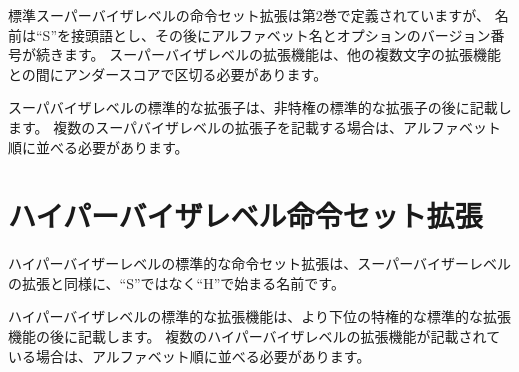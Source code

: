 \begin{comment}
Standard supervisor-level instruction-set extensions are defined in Volume II,
but are named using ``S'' as a prefix, followed by an alphabetical name and an
optional version number.  Supervisor-level extensions must be separated from
other multi-letter extensions by an underscore.
\end{comment}
標準スーパーバイザレベルの命令セット拡張は第2巻で定義されていますが、
名前は``S''を接頭語とし、その後にアルファベット名とオプションのバージョン番号が続きます。
スーパーバイザレベルの拡張機能は、他の複数文字の拡張機能との間にアンダースコアで区切る必要があります。

\begin{comment}
Standard supervisor-level extensions should be listed after standard
unprivileged extensions.  If multiple supervisor-level extensions are listed,
they should be ordered alphabetically.
\end{comment}
スーパバイザレベルの標準的な拡張子は、非特権の標準的な拡張子の後に記載します。
複数のスーパバイザレベルの拡張子を記載する場合は、アルファベット順に並べる必要があります。

\begin{comment}
\section{Hypervisor-level Instruction-Set Extensions}
\end{comment}
\section{ハイパーバイザレベル命令セット拡張}

\begin{comment}
Standard hypervisor-level instruction-set extensions are named like
supervisor-level extensions, but beginning with the letter ``H'' instead of
the letter ``S''.
\end{comment}
ハイパーバイザーレベルの標準的な命令セット拡張は、スーパーバイザーレベルの拡張と同様に、``S''ではなく``H''で始まる名前です。

\begin{comment}
Standard hypervisor-level extensions should be listed after standard
lesser-privileged extensions.  If multiple hypervisor-level extensions are
listed, they should be ordered alphabetically.
\end{comment}
ハイパーバイザレベルの標準的な拡張機能は、より下位の特権的な標準的な拡張機能の後に記載します。
複数のハイパーバイザレベルの拡張機能が記載されている場合は、アルファベット順に並べる必要があります。

